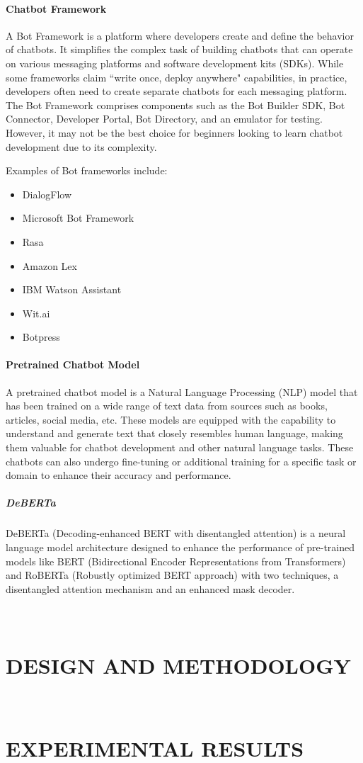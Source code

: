 \documentclass[12pt,oneside,openright,a4paper]{cpe-english-project}
\begin{document}
    \subsubsection{Chatbot Framework}
      \qquad A Bot Framework is a platform where developers create and define the behavior of chatbots. It simplifies the complex task of building chatbots that can operate on various messaging platforms and software development kits (SDKs). While some frameworks claim “write once, deploy anywhere" capabilities, in practice, developers often need to create separate chatbots for each messaging platform. The Bot Framework comprises components such as the Bot Builder SDK, Bot Connector, Developer Portal, Bot Directory, and an emulator for testing. However, it may not be the best choice for beginners looking to learn chatbot development due to its complexity.\par
      \qquad Examples of Bot frameworks include:\par
      \begin{itemize}
        \item DialogFlow
        \item Microsoft Bot Framework
        \item Rasa
        \item Amazon Lex
        \item IBM Watson Assistant
        \item Wit.ai
        \item Botpress
      \end{itemize}
    
    \subsubsection{ Pretrained Chatbot Model}
      \qquad A pretrained chatbot model is a Natural Language Processing (NLP) model that has been trained on a wide range of text data from sources such as books, articles, social media, etc. These models are equipped with the capability to understand and generate text that closely resembles human language, making them valuable for chatbot development and other natural language tasks. These chatbots can also undergo fine-tuning or additional training for a specific task or domain to enhance their accuracy and performance.\par
      \paragraph{DeBERTa \\}
        \quad DeBERTa (Decoding-enhanced BERT with disentangled attention) is a neural language model architecture designed to enhance the performance of pre-trained models like BERT (Bidirectional Encoder Representations from Transformers) and RoBERTa (Robustly optimized BERT approach) with two techniques, a disentangled attention mechanism and an enhanced mask decoder.\par

\chapter{\null\\ DESIGN AND METHODOLOGY}


\chapter{\null\\ EXPERIMENTAL RESULTS}
\end{document}

